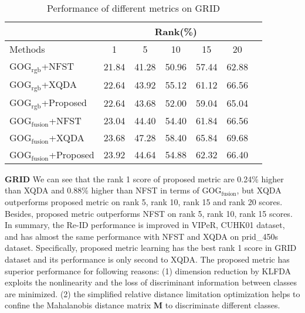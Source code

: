 \documentclass[conference,compsoc]{IEEEtran}
\begin{document}
\begin{table}[H]
\caption{Performance of different metrics on GRID}
\centering
\begin{tabular}{|l|c|c|c|c|c|c|}
\hline
& \multicolumn{5}{|c|}{Rank(\%)} \\
\hline
Methods& 1 & 5 &10& 15&20\\
\hline
GOG$_\text{rgb}$+NFST& 21.84&41.28 &50.96& 57.44&62.88 \\ 
\hline
GOG$_\text{rgb}$+XQDA& 22.64&43.92 &55.12 &61.12&66.56\\ 
\hline
GOG$_\text{rgb}$+Proposed&22.64&43.68&52.00&59.04&65.04\\  %
\hline
GOG$_\text{fusion}$+NFST& 23.04&44.40 &54.40 &61.84&66.56\\ 
\hline
GOG$_\text{fusion}$+XQDA& 23.68&47.28 &58.40 &65.84&69.68 \\ 
\hline
GOG$_\text{fusion}$+Proposed&23.92&44.64&54.88&62.32&66.40\\ %

\hline

\end{tabular}
\end{table}
\textbf{GRID} We can see that the rank 1 score of proposed metric are 0.24\% higher than XQDA and 0.88\% higher than NFST in terms of GOG$_\text{fusion}$, but XQDA outperforms proposed metric on rank 5, rank 10, rank 15 and rank 20 scores. Besides, proposed metric outperforms NFST on rank 5, rank 10, rank 15 scores.\\
\indent In summary, the Re-ID performance is improved in VIPeR, CUHK01 dataset, and has almost the same performance with NFST and XQDA on prid\_450s dataset. Specifically, proposed metric learning has the best rank 1 score in GRID dataset and its performance is only second to XQDA. The proposed metric has superior performance for following reasons: (1) dimension reduction by KLFDA exploits the nonlinearity and the loss of discriminant information between classes are minimized. (2) the simplified relative distance limitation optimization helps to confine the Mahalanobis distance matrix $\bm{M}$ to discriminate different classes.  
\end{document}
